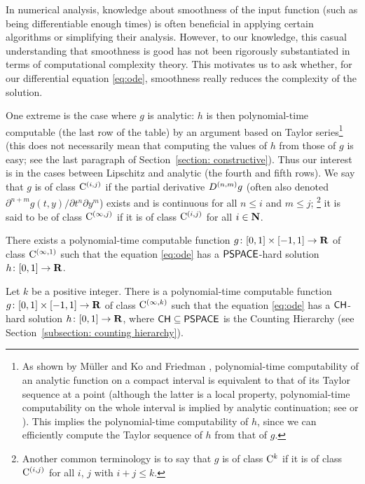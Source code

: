 In numerical analysis, 
knowledge about smoothness of the input function 
(such as being differentiable enough times) 
is often beneficial 
in applying certain algorithms or simplifying their analysis.
However, 
to our knowledge, 
this casual understanding that smoothness is good 
has not been rigorously substantiated 
in terms of computational complexity theory. 
This motivates us to ask whether, 
for our differential equation \eqref{eq:ode}, 
smoothness really reduces the complexity of the solution. 

One extreme is the case where $g$ is analytic: 
$h$ is then polynomial-time computable 
(the last row of the table) 
by an argument based on Taylor series\footnote{
As shown by M\"uller \cite{muller1987uniform} and 
Ko and Friedman \cite{ko1988computing}, 
polynomial-time computability of an analytic function 
on a compact interval is 
equivalent to that of its Taylor sequence at a point 
(although the latter is a local property, 
polynomial-time computability on the whole interval is implied 
by analytic continuation; 
see \cite[Corollary~4.5]{muller1987uniform}
or \cite[Theorem~11]{kawamura2010complexity}). 
This implies the polynomial-time computability of $h$, 
since we can efficiently compute the 
Taylor sequence of $h$ from that of $g$. 
} (this does not necessarily mean that 
computing the values of $h$ from those of $g$ is easy; 
see the last paragraph of Section~\ref{section: constructive}). 
Thus our interest is in 
the cases between Lipschitz and analytic 
(the fourth and fifth rows). 
We say that $g$ is of class $\mathrm C ^{(i, j)}$
if the partial derivative $D ^{(n, m)} g$ 
(often also denoted $\partial ^{n + m} g (t, y) / \partial t ^n \partial y ^m$)
exists and is continuous for all $n \le i$ and $m \le j$;%
\footnote{%
Another common terminology is to say that $g$ is of class $\mathrm C ^k$
if it is of class $\mathrm C ^{(i,j)}$ 
for all $i$, $j$ with $i + j \leq k$.}
it is said to be of class $\mathrm C ^{(\infty, j)}$ if
it is of class $\mathrm C ^{(i, j)}$ for all $i \in \mathbf N$. 

\begin{theorem}
 \label{DifferentiableIsPspace}
There exists a polynomial-time computable function
$g \colon [0,1] \times [-1,1] \to \mathbf R$ 
of class $\mathrm C ^{(\infty, 1)}$ such that
the equation \eqref{eq:ode} has a 
$\mathsf{PSPACE}$-hard solution $h \colon [0, 1] \to \mathbf R$. 
 \end{theorem}

 \begin{theorem}
  \label{KTimesIsCH}
Let $k$ be a positive integer. 
There is a polynomial-time computable function
$g \colon [0,1] \times [-1,1] \to \mathbf R$ 
of class $\mathrm C ^{(\infty, k)}$ such that
the equation \eqref{eq:ode} has a 
$\mathsf{CH}$-hard solution $h \colon [0, 1] \to \mathbf R$, 
where $\mathsf{CH} \subseteq \mathsf{PSPACE}$ is the 
Counting Hierarchy (see Section~\ref{subsection: counting hierarchy}). 
 \end{theorem}

